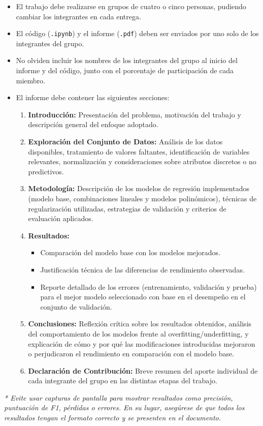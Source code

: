 \begin{itemize}
    \item El trabajo debe realizarse en  grupos de cuatro o cinco personas, pudiendo cambiar los integrantes en cada entrega.
    \item El código (\texttt{.ipynb}) y el informe (\texttt{.pdf}) deben ser enviados por uno solo de los integrantes del grupo.
    \item No olviden incluir los nombres de los integrantes del grupo al inicio del informe y del código, junto con el porcentaje de participación de cada miembro.
    \item El informe debe contener las siguientes secciones:
    \begin{enumerate}
       \item \textbf{Introducción:} Presentación del problema, motivación del trabajo y descripción general del enfoque adoptado.
    
    \item \textbf{Exploración del Conjunto de Datos:} Análisis de los datos disponibles, tratamiento de valores faltantes, identificación de variables relevantes, normalización y consideraciones sobre atributos discretos o no predictivos.
    
    \item \textbf{Metodología:} Descripción de los modelos de regresión implementados (modelo base, combinaciones lineales y modelos polinómicos), técnicas de regularización utilizadas, estrategias de validación y criterios de evaluación aplicados.
    
    \item \textbf{Resultados:} 
    \begin{itemize}
        \item Comparación del modelo base con los modelos mejorados.
        \item Justificación técnica de las diferencias de rendimiento observadas.
        \item Reporte detallado de los errores (entrenamiento, validación y prueba) para el mejor modelo seleccionado con base en el desempeño en el conjunto de validación.
    \end{itemize}
    
    \item \textbf{Conclusiones:} Reflexión crítica sobre los resultados obtenidos, análisis del comportamiento de los modelos frente al overfitting/underfitting, y explicación de cómo y por qué las modificaciones introducidas mejoraron o perjudicaron el rendimiento en comparación con el modelo base.
    
    \item \textbf{Declaración de Contribución:} Breve resumen del aporte individual de cada integrante del grupo en las distintas etapas del trabajo.

    \end{enumerate}
\end{itemize}
\textit{* Evite usar capturas de pantalla para mostrar resultados como precisión, puntuación de F1, pérdidas o errores. En su lugar, asegúrese de que todos los resultados tengan el formato correcto y se presenten en el documento.} \\

